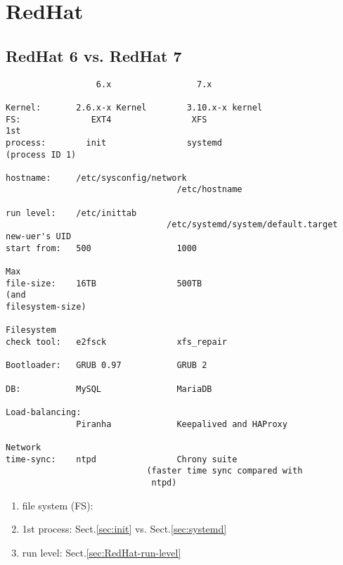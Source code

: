 \chapter{RedHat}
\label{chap:RedHat}

\section{RedHat 6 vs. RedHat 7}

\begin{verbatim}
                  6.x                 7.x

Kernel:       2.6.x-x Kernel        3.10.x-x kernel
FS:              EXT4                XFS
1st 
process:        init                systemd  
(process ID 1)

hostname:     /etc/sysconfig/network 
                                  /etc/hostname
                             
run level:    /etc/inittab
                                /etc/systemd/system/default.target
new-uer's UID
start from:   500                 1000
                            
Max
file-size:    16TB                500TB
(and
filesystem-size)

Filesystem
check tool:   e2fsck              xfs_repair

Bootloader:   GRUB 0.97           GRUB 2

DB:           MySQL               MariaDB

Load-balancing:
              Piranha             Keepalived and HAProxy
              
Network
time-sync:    ntpd                Chrony suite 
                            (faster time sync compared with
                             ntpd)
\end{verbatim}

\begin{enumerate}
  \item file system (FS): 
  \item 1st process: Sect.\ref{sec:init} vs. Sect.\ref{sec:systemd}
  
  \item run level: Sect.\ref{sec:RedHat-run-level}
  
\end{enumerate}